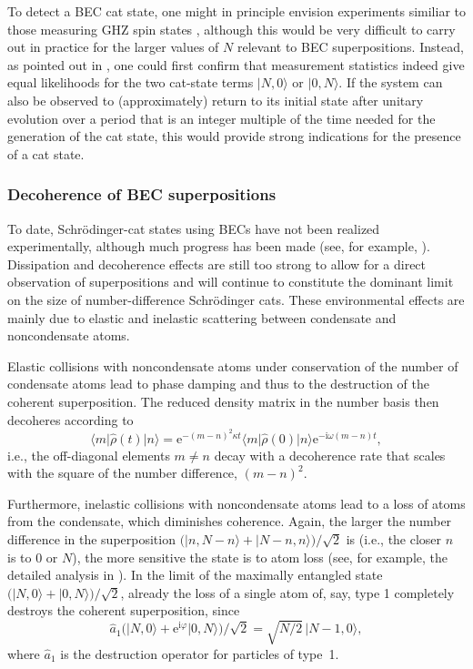 \documentclass[twocolumn,aps,floatfix,amsmath,amssymb,showpacs,nofootinbib]{revtex4}
\newcommand{\be}{\begin{equation}} \newcommand{\ee}{\end{equation}}
\newcommand{\ket}[1]{\ensuremath{|{#1\rangle}}}
\newcommand{\bra}[1]{\ensuremath{{\langle #1}|}}
\newcommand{\e}{\ensuremath{\mathrm{e}}}
\begin{document}
To detect a BEC cat state, one might in principle envision experiments
similiar to those measuring GHZ spin states
\cite{Mermin:1990:un,Dalvit:2000:bb,Sackett:2000:uu}, although this
would be very difficult to carry out in practice for the larger values
of $N$ relevant to BEC superpositions. Instead, as pointed out in
\cite{Dalvit:2000:bb}, one could first confirm that measurement
statistics indeed give equal likelihoods for the two cat-state terms
$\ket{N,0}$ or $\ket{0,N}$. If the system can also be observed to
(approximately) return to its initial state after unitary evolution
over a period that is an integer multiple of the time needed for the
generation of the cat state, this would provide strong indications for
the presence of a cat state.

\subsubsection{Decoherence of BEC superpositions}

To date, Schr\"odinger-cat states using BECs have not been realized
experimentally, although much progress has been made (see, for
example, \cite{Albiez:2004:nn}). Dissipation and decoherence
effects are still too strong to allow for a direct observation of
superpositions and will continue to constitute the dominant limit on
the size of number-difference Schr\"odinger cats. These environmental
effects are mainly due to elastic and inelastic scattering between
condensate and noncondensate atoms.

Elastic collisions with noncondensate atoms under conservation of the
number of condensate atoms lead to phase damping and thus to the
destruction of the coherent superposition. The reduced density matrix
in the number basis then decoheres according to \cite{Louis:2001:mu}
%
\be
\bra{m}\widehat{\rho}(t)\ket{n} =  \e^{-(m-n)^2
  \kappa t}  \bra{m}\widehat{\rho}(0)\ket{n} \e^{-\mathrm{i}\omega(m-n)t},
\ee
%
i.e., the off-diagonal elements $m\not= n$ decay with a decoherence
rate that scales with the square of the number difference, $(m-n)^2$.

Furthermore, inelastic collisions with noncondensate atoms lead to a
loss of atoms from the condensate, which diminishes coherence.  Again,
the larger the number difference in the superposition $\bigr(
\ket{n,N-n} + \ket{N-n,n}\bigr) / \sqrt{2}$ is (i.e., the closer $n$
is to $0$ or $N$), the more sensitive the state is to atom loss (see,
for example, the detailed analysis in \cite{Dunningham:2001:da}).
In the limit of the maximally entangled state $\bigl( \ket{N,0} +
\ket{0,N} \bigr) / \sqrt{2}$, already the loss of a single atom of,
say, type 1 completely destroys the coherent superposition, since
%
\be
\widehat{a}_1 \bigl( \ket{N,0} + \e^{\mathrm{i}\varphi} \ket{0,N} \bigr) / \sqrt{2} = \sqrt{N/2
} \, \ket{N-1,0},
\ee
%
where $\widehat{a}_1$ is the destruction operator for particles of
type~1. 
\end{document}
